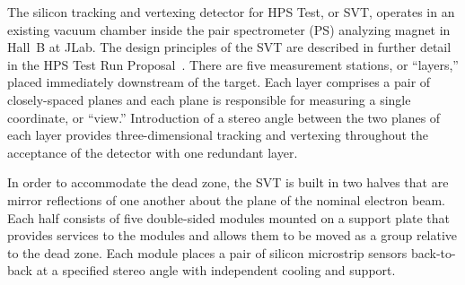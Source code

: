 The silicon tracking and vertexing detector for HPS Test, or SVT, operates in an existing vacuum chamber 
inside the pair spectrometer (PS) analyzing magnet in Hall~B at JLab.  The design principles of the SVT are 
described in further detail in the HPS Test Run Proposal~\cite{HPS_tPROP}. There are five measurement 
stations, or ``layers,'' placed immediately downstream of the target. Each layer comprises a pair of 
closely-spaced planes and each plane is responsible for measuring a single coordinate, or ``view.'' 
Introduction of a stereo angle between the two planes of each layer provides three-dimensional tracking and 
vertexing throughout the acceptance of the detector with one redundant layer. 

In order to accommodate the dead zone, the SVT is built in two halves that are mirror reflections of one 
another about the plane of the nominal electron beam.  Each half consists of five double-sided modules 
mounted on a support plate that provides services to the modules and allows them to be moved as a group 
relative to the dead zone. Each module places a pair of silicon microstrip sensors back-to-back at a specified 
stereo angle with independent cooling and support.

